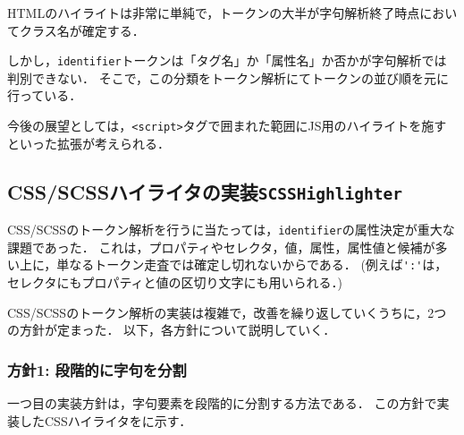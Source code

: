 \documentclass[autodetect-engine,dvi=dvipdfmx,ja=standard,
               a4j,11pt]{bxjsarticle}
\newcommand{\figref}[1]{\makebox{図~\ref{#1}}}
\begin{document}
HTMLのハイライトは非常に単純で，トークンの大半が字句解析終了時点においてクラス名が確定する．

しかし，\verb|identifier|トークンは「タグ名」か「属性名」か否かが字句解析では判別できない．
そこで，この分類をトークン解析にてトークンの並び順を元に行っている．

今後の展望としては，\verb|<script>|タグで囲まれた範囲にJS用のハイライトを施すといった拡張が考えられる．

\subsection{CSS/SCSSハイライタの実装{\tt SCSSHighlighter}}

CSS/SCSSのトークン解析を行うに当たっては，\verb|identifier|の属性決定が重大な課題であった．
これは，プロパティやセレクタ，値，属性，属性値と候補が多い上に，単なるトークン走査では確定し切れないからである．
(例えば\verb|':'|は，セレクタにもプロパティと値の区切り文字にも用いられる．)

CSS/SCSSのトークン解析の実装は複雑で，改善を繰り返していくうちに，2つの方針が定まった．
以下，各方針について説明していく．

\subsubsection{方針1: 段階的に字句を分割}

一つ目の実装方針は，字句要素を段階的に分割する方法である．
この方針で実装したCSSハイライタを\figref{prog:scss1}に示す．
\end{document}
